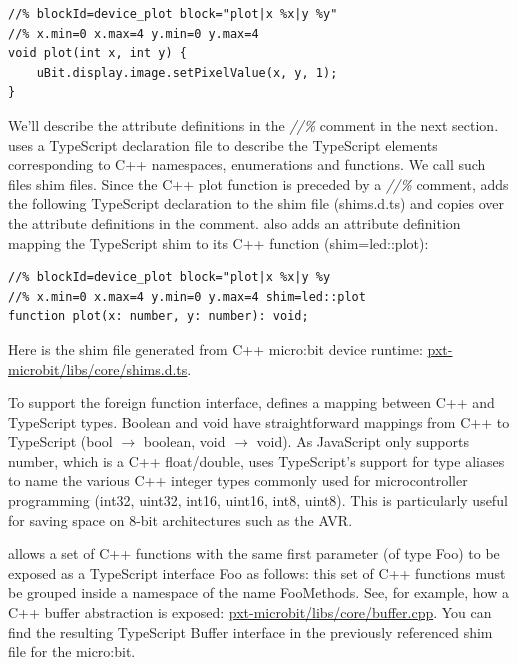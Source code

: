 \begin{lstlisting}
//% blockId=device_plot block="plot|x %x|y %y"
//% x.min=0 x.max=4 y.min=0 y.max=4
void plot(int x, int y) {
    uBit.display.image.setPixelValue(x, y, 1);
}
\end{lstlisting}

We'll describe the attribute definitions in the \emph{//\%} comment in the next section. 
\MC uses a TypeScript declaration file to describe the TypeScript elements corresponding
to C++ namespaces, enumerations and functions.  We call such files shim files.
Since the C++ plot function is preceded by a \emph{//\%} comment, 
\MC adds the following TypeScript declaration to the shim file (shims.d.ts) and copies
over the attribute definitions in the comment. \MC also adds an attribute definition mapping
the TypeScript shim to its C++ function (shim=led::plot):

\begin{lstlisting}
//% blockId=device_plot block="plot|x %x|y %y
//% x.min=0 x.max=4 y.min=0 y.max=4 shim=led::plot
function plot(x: number, y: number): void;
\end{lstlisting}

Here is the shim file generated from C++ micro:bit device runtime:
\href{https://github.com/Microsoft/pxt-microbit/blob/master/libs/core/shims.d.ts}{pxt-microbit/libs/core/shims.d.ts}.

To support the foreign function interface, \MC defines a mapping between C++ and TypeScript types.
Boolean and void have straightforward mappings from C++ to TypeScript (bool $\rightarrow$ boolean, void $\rightarrow$ void). 
As JavaScript only supports number, which is a C++ float/double, \MC uses TypeScript's support
for type aliases to name the various C++ integer types commonly used for microcontroller programming
(int32, uint32, int16, uint16, int8, uint8). 
This is particularly useful for saving space on 8-bit architectures such as the AVR. 

\MC allows a set of C++ functions with the same first parameter (of type Foo) to be
exposed as a TypeScript interface Foo as follows: this set of C++ functions must be grouped
inside a namespace of the name FooMethods.  See, for example, how a C++ buffer abstraction is exposed:
\href{https://github.com/Microsoft/pxt-microbit/blob/master/libs/core/buffer.cpp}{pxt-microbit/libs/core/buffer.cpp}.
You can find the resulting TypeScript Buffer interface in the previously referenced shim file for the micro:bit.

